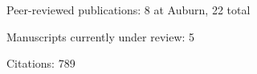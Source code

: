\begin{veryTightItemize}
    \item Peer-reviewed publications: 8 at Auburn, 22 total
    \item Manuscripts currently under review: 5
    \item Citations: 789
\end{veryTightItemize}
